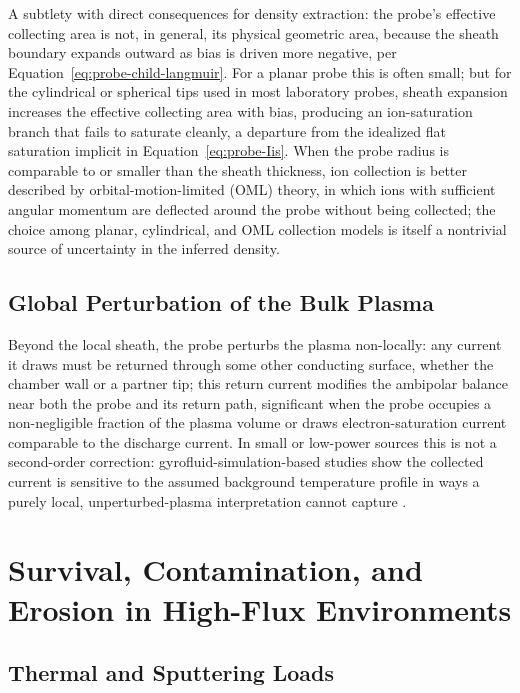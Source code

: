 A subtlety with direct consequences for density extraction: the probe's effective collecting area is not, in general, its physical geometric area, because the sheath boundary expands outward as bias is driven more negative, per Equation~\eqref{eq:probe-child-langmuir}. For a planar probe this is often small; but for the cylindrical or spherical tips used in most laboratory probes, sheath expansion increases the effective collecting area with bias, producing an ion-saturation branch that fails to saturate cleanly, a departure from the idealized flat saturation implicit in Equation~\eqref{eq:probe-Iis}. When the probe radius is comparable to or smaller than the sheath thickness, ion collection is better described by orbital-motion-limited (OML) theory, in which ions with sufficient angular momentum are deflected around the probe without being collected; the choice among planar, cylindrical, and OML collection models is itself a nontrivial source of uncertainty in the inferred density.

\subsection{Global Perturbation of the Bulk Plasma}

Beyond the local sheath, the probe perturbs the plasma non-locally: any current it draws must be returned through some other conducting surface, whether the chamber wall or a partner tip; this return current modifies the ambipolar balance near both the probe and its return path, significant when the probe occupies a non-negligible fraction of the plasma volume or draws electron-saturation current comparable to the discharge current. In small or low-power sources this is not a second-order correction: gyrofluid-simulation-based studies show the collected current is sensitive to the assumed background temperature profile in ways a purely local, unperturbed-plasma interpretation cannot capture \cite{ref0194}.

\section{Survival, Contamination, and Erosion in High-Flux Environments}
\label{sec:probes-survival}

\subsection{Thermal and Sputtering Loads}


